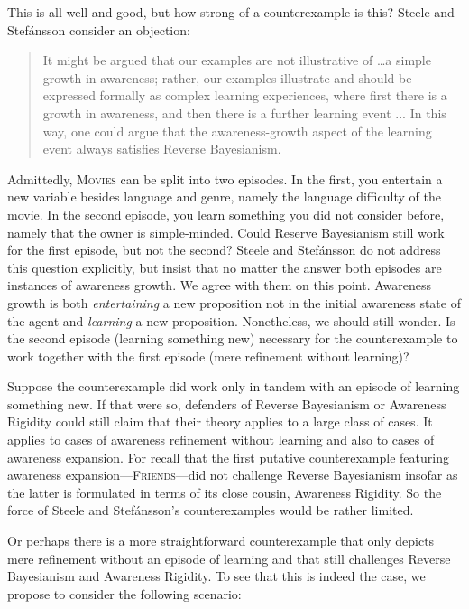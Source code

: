 \documentclass[
  11pt,
  dvipsnames,enabledeprecatedfontcommands]{scrartcl}
\begin{document}
This is all well and good, but how strong of a counterexample is this?
Steele and Stefánsson consider an objection:

\begin{quote}It might be argued that our examples are not illustrative of \dots a simple growth in awareness; rather, our examples illustrate and should be expressed 
  formally as complex learning experiences, where first there is a growth in awareness, and then 
  there is a further learning event ... In this way, one could argue that the awareness-growth 
  aspect of the learning event always satisfies Reverse Bayesianism.
\end{quote}

\noindent  Admittedly, \textsc{Movies} can be split into two episodes.
In the first, you entertain a new variable besides language and genre,
namely the language difficulty of the movie. In the second episode, you
learn something you did not consider before, namely that the owner is
simple-minded. Could Reserve Bayesianism still work for the first
episode, but not the second? Steele and Stefánsson do not address this
question explicitly, but insist that no matter the answer both episodes
are instances of awareness growth. We agree with them on this point.
Awareness growth is both \textit{entertaining} a new proposition not in
the initial awareness state of the agent and \textit{learning} a new
proposition. Nonetheless, we should still wonder. Is the second episode
(learning something new) necessary for the counterexample to work
together with the first episode (mere refinement without learning)?

Suppose the counterexample did work only in tandem with an episode of
learning something new. If that were so, defenders of Reverse
Bayesianism or Awareness Rigidity could still claim that their theory
applies to a large class of cases. It applies to cases of awareness
refinement without learning and also to cases of awareness expansion.
For recall that the first putative counterexample featuring awareness
expansion---\textsc{Friends}---did not challenge Reverse Bayesianism
insofar as the latter is formulated in terms of its close cousin,
Awareness Rigidity. So the force of Steele and Stefánsson's
counterexamples would be rather limited.

Or perhaps there is a more straightforward counterexample that only
depicts mere refinement without an episode of learning and that still
challenges Reverse Bayesianism and Awareness Rigidity. To see that this
is indeed the case, we propose to consider the following scenario:
\end{document}

